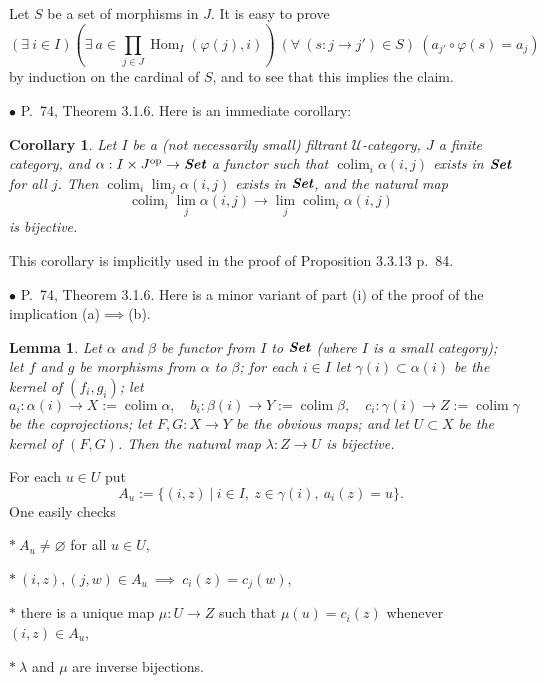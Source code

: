 \documentclass[12pt]{article}
\newtheorem{lem}[thm]{Lemma}
\newtheorem{cor}[thm]{Corollary}
\theoremstyle{remark}%
\newcommand{\bu}{\bullet}
\newcommand{\n}{\noindent}
\newcommand{\U}{\mathcal U}
\newcommand{\p}{\varphi}
\DeclareMathOperator*{\coli}{colim}
\DeclareMathOperator{\h}{Hom}
\DeclareMathOperator{\op}{op}
\begin{document}
Let $S$ be a set of morphisms in $J$. It is easy to prove 
$$
(\exists\ i\in I)\left(\exists\ a\in\prod_{j\in J}\h_I(\p(j),i)\right)\ (\forall\ (s:j\to j')\in S)\ (a_{j'}\circ\p(s)=a_j) 
$$ 
by induction on the cardinal of $S$, and to see that this implies the claim. 


\n$\bu$ P.~74, Theorem 3.1.6. Here is an immediate corollary: 
%
\begin{cor}\label{316}
Let $I$ be a (not necessarily small) filtrant $\U$-category, $J$ a finite category, and $\alpha:I\times J^{\op}\to\textbf{\em Set}$ a functor such that $\coli_i\alpha(i,j)$ exists in $\textbf{\em Set}$ for all $j$. Then $\coli_i\lim_j\alpha(i,j)$ exists in $\textbf{\em Set}$, and the natural map 
$$
\coli_i\lim_j\alpha(i,j)\to
\lim_j\coli_i\alpha(i,j)
$$ 
is bijective. 
\end{cor}
%
This corollary is implicitly used in the proof of Proposition 3.3.13 p.~84. 


\n$\bu$ P.~74, Theorem 3.1.6. Here is a minor variant of part (i) of the proof of the implication (a)$\implies$(b).\smallskip 

\begin{lem} 
Let $\alpha$ and $\beta$ be functor from $I$ to $\textbf{\em Set}$ (where $I$ is a small category); let $f$ and $g$ be morphisms from $\alpha$ to $\beta$; for each $i\in I$ let $\gamma(i)\subset\alpha(i)$ be the kernel of $(f_i,g_i)$; let 
$$
a_i:\alpha(i)\to X:=\coli\alpha,\quad 
b_i:\beta(i)\to Y:=\coli\beta,\quad 
c_i:\gamma(i)\to Z:=\coli\gamma
$$ 
be the coprojections; let $F,G:X\to Y$ be the obvious maps; and let $U\subset X$ be the kernel of $(F,G)$. Then the natural map $\lambda:Z\to U$ is bijective.
\end{lem}
% 
\n{\em Proof.} For each $u\in U$ put 
$$
A_u:=\{(i,z)\ |\ i\in I,\ z\in\gamma(i),\ a_i(z)=u\}.
$$ 
One easily checks 

\n$*\ A_u\ne\varnothing$ for all $u\in U$,

\n$*\ (i,z),(j,w)\in A_u\ \implies\ c_i(z)=c_j(w)$, 

\n$*$ there is a unique map $\mu:U\to Z$ such that $\mu(u)=c_i(z)$ whenever $(i,z)\in A_u$,

\n$*\ \lambda$ and $\mu$ are inverse bijections. 

\end{document}
